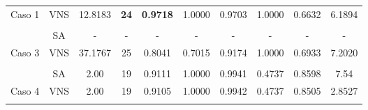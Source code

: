 \begin{table}
{\begin{tabular}{cccccccccc}
			\multicolumn{1}{c|}{\multirow{-2}{*}{Caso 1}} & VNS & 12.8183                                                              & {\color[HTML]{9A0000} \textbf{24}}                                 & {\color[HTML]{9A0000} \textbf{0.9718}}                  & 1.0000 & 0.9703 & 1.0000 & 0.6632 & 6.1894       \\
			&     &                                                                      &                                                                    &                                                         &        &        &        &        &              \\
			\multicolumn{1}{c|}{}                         & SA  & -                                                                    & -                                                                  & -                                                       & -      & -      & -      & -      & -            \\
			\multicolumn{1}{c|}{\multirow{-2}{*}{Caso 3}} & VNS & 37.1767                                                              & 25                                                                 & 0.8041                                                  & 0.7015 & 0.9174 & 1.0000 & 0.6933 & 7.2020       \\
			&     &                                                                      &                                                                    &                                                         &        &        &        &        &              \\
			\multicolumn{1}{c|}{}                         & SA  & 2.00                                                                 & 19                                                                 & 0.9111                                                  & 1.0000 & 0.9941 & 0.4737 & 0.8598 & 7.54         \\
			\multicolumn{1}{c|}{\multirow{-2}{*}{Caso 4}} & VNS & 2.00                                                               & 19                                                                 & 0.9105                                                  & 1.0000 & 0.9942 & 0.4737 & 0.8505 & 2.8527       \\
			&     &                                                                      &                                                                    &                                                         &        &        &        &        &              \\

\end{tabular}}
\end{table}

